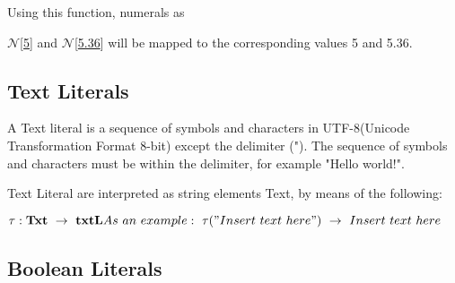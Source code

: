 	
	
	
	
	Using this function, numerals as 
	
	
	\begin{math}
		\mathcal{N}
	\end{math}[\underline{5}] and 
	\begin{math}
		\mathcal{N}		
	\end{math}[\underline{5.36}] will be mapped to the corresponding values 5 and 5.36. 
	
	
	
	
	
	
	
	
	\subsection{Text Literals}
	
	
	A Text literal is a sequence of symbols and characters in UTF-8(Unicode Transformation Format 8-bit) except the delimiter ("). The sequence of symbols and characters must be within the delimiter, for example "Hello world!". 
	
	
	
	
	
	
	
	
	
	
	
	
	
	
	
	
	
	
	Text Literal are interpreted as string elements Text, by means of the following:
	
	
	
	
	
	\begin{math}		
		\tau : \textbf{Txt} \ \rightarrow \ \textbf{txtL} \newline	
		As \ an \ example: \ \tau("Insert \ text \ here") \ \rightarrow \ Insert \ text \ here		
	\end{math}
	
	
	
	
	
	\subsection{Boolean Literals}
	

